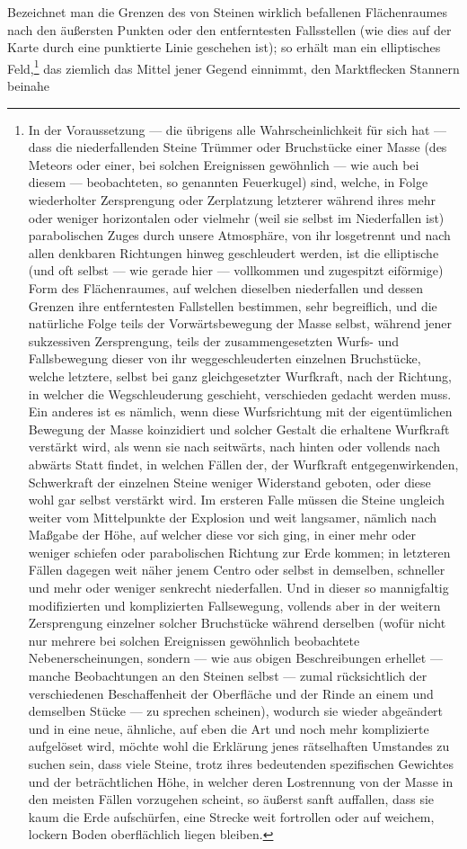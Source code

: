 \documentclass[a4paper, 11pt, oneside, german]{article}
\begin{document}
Bezeichnet man die Grenzen des von Steinen wirklich befallenen Flächenraumes nach den äußersten Punkten oder den entferntesten Fallsstellen (wie dies auf der Karte durch eine punktierte Linie geschehen ist); so erhält man ein elliptisches Feld,\footnote{In der Voraussetzung --- die übrigens alle Wahrscheinlichkeit für sich hat --- dass die niederfallenden Steine Trümmer oder Bruchstücke einer Masse (des Meteors oder einer, bei solchen Ereignissen gewöhnlich --- wie auch bei diesem --- beobachteten, so genannten Feuerkugel) sind, welche, in Folge wiederholter Zersprengung oder Zerplatzung letzterer während ihres mehr oder weniger horizontalen oder vielmehr (weil sie selbst im Niederfallen ist) parabolischen Zuges durch unsere Atmosphäre, von ihr losgetrennt und nach allen denkbaren Richtungen hinweg geschleudert werden, ist die elliptische (und oft selbst --- wie gerade hier --- vollkommen und zugespitzt eiförmige) Form des Flächenraumes, auf welchen dieselben niederfallen und dessen Grenzen ihre entferntesten Fallstellen bestimmen, sehr begreiflich, und die natürliche Folge teils der Vorwärtsbewegung der Masse selbst, während jener sukzessiven Zersprengung, teils der zusammengesetzten Wurfs- und Fallsbewegung dieser von ihr weggeschleuderten einzelnen Bruchstücke, welche letztere, selbst bei ganz gleichgesetzter Wurfkraft, nach der Richtung, in welcher die Wegschleuderung geschieht, verschieden gedacht werden muss. Ein anderes ist es nämlich, wenn diese Wurfsrichtung mit der eigentümlichen Bewegung der Masse koinzidiert und solcher Gestalt die erhaltene Wurfkraft verstärkt wird, als wenn sie nach seitwärts, nach hinten oder vollends nach abwärts Statt findet, in welchen Fällen der, der Wurfkraft entgegenwirkenden, Schwerkraft der einzelnen Steine weniger Widerstand geboten, oder diese wohl gar selbst verstärkt wird. Im ersteren Falle müssen die Steine ungleich weiter vom Mittelpunkte der Explosion und weit langsamer, nämlich nach Maßgabe der Höhe, auf welcher diese vor sich ging, in einer mehr oder weniger schiefen oder parabolischen Richtung zur Erde kommen; in letzteren Fällen dagegen weit näher jenem Centro oder selbst in demselben, schneller und mehr oder weniger senkrecht niederfallen. Und in dieser so mannigfaltig modifizierten und komplizierten Fallsewegung, vollends aber in der weitern Zersprengung einzelner solcher Bruchstücke während derselben (wofür nicht nur mehrere bei solchen Ereignissen gewöhnlich beobachtete Nebenerscheinungen, sondern --- wie aus obigen Beschreibungen erhellet --- manche Beobachtungen an den Steinen selbst --- zumal rücksichtlich der verschiedenen Beschaffenheit der Oberfläche und der Rinde an einem und demselben Stücke --- zu sprechen scheinen), wodurch sie wieder abgeändert und in eine neue, ähnliche, auf eben die Art und noch mehr komplizierte aufgelöset wird, möchte wohl die Erklärung jenes rätselhaften Umstandes zu suchen sein, dass viele Steine, trotz ihres bedeutenden spezifischen Gewichtes und der beträchtlichen Höhe, in welcher deren Lostrennung von der Masse in den meisten Fällen vorzugehen scheint, so äußerst sanft auffallen, dass sie kaum die Erde aufschürfen, eine Strecke weit fortrollen oder auf weichem, lockern Boden oberflächlich liegen bleiben.} das ziemlich das Mittel jener Gegend einnimmt, den Marktflecken Stannern beinahe 
\end{document}

